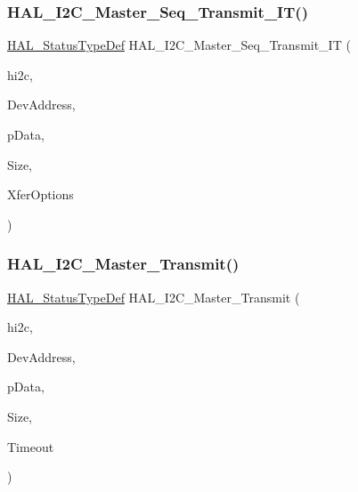 \subsubsection{\texorpdfstring{H\+A\+L\+\_\+\+I2\+C\+\_\+\+Master\+\_\+\+Seq\+\_\+\+Transmit\+\_\+\+I\+T()}{HAL\_I2C\_Master\_Seq\_Transmit\_IT()}}
{\footnotesize\ttfamily \hyperlink{stm32f4xx__hal__def_8h_a63c0679d1cb8b8c684fbb0632743478f}{H\+A\+L\+\_\+\+Status\+Type\+Def} H\+A\+L\+\_\+\+I2\+C\+\_\+\+Master\+\_\+\+Seq\+\_\+\+Transmit\+\_\+\+IT (\begin{DoxyParamCaption}\item[{\hyperlink{group___i2_c__handle___structure__definition_ga68e9f45c2fd2161fb827ccdeabb55ea5}{I2\+C\+\_\+\+Handle\+Type\+Def} $\ast$}]{hi2c,  }\item[{uint16\+\_\+t}]{Dev\+Address,  }\item[{uint8\+\_\+t $\ast$}]{p\+Data,  }\item[{uint16\+\_\+t}]{Size,  }\item[{uint32\+\_\+t}]{Xfer\+Options }\end{DoxyParamCaption})}

\mbox{\label{group___i2_c___exported___functions___group2_ga9440a306e25c7bd038cfa8619ec9a830}} 
\subsubsection{\texorpdfstring{H\+A\+L\+\_\+\+I2\+C\+\_\+\+Master\+\_\+\+Transmit()}{HAL\_I2C\_Master\_Transmit()}}
{\footnotesize\ttfamily \hyperlink{stm32f4xx__hal__def_8h_a63c0679d1cb8b8c684fbb0632743478f}{H\+A\+L\+\_\+\+Status\+Type\+Def} H\+A\+L\+\_\+\+I2\+C\+\_\+\+Master\+\_\+\+Transmit (\begin{DoxyParamCaption}\item[{\hyperlink{group___i2_c__handle___structure__definition_ga68e9f45c2fd2161fb827ccdeabb55ea5}{I2\+C\+\_\+\+Handle\+Type\+Def} $\ast$}]{hi2c,  }\item[{uint16\+\_\+t}]{Dev\+Address,  }\item[{uint8\+\_\+t $\ast$}]{p\+Data,  }\item[{uint16\+\_\+t}]{Size,  }\item[{uint32\+\_\+t}]{Timeout }\end{DoxyParamCaption})}

